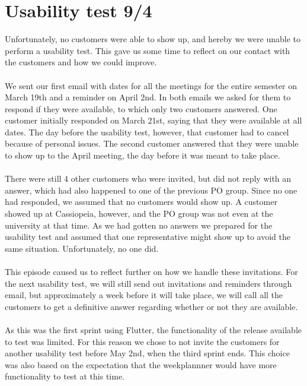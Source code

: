 \section{Usability test 9/4}
Unfortunately, no customers were able to show up, and hereby we were unable to perform a usability test.
This gave us some time to reflect on our contact with the customers and how we could improve.
\\\\
We sent our first email with dates for all the meetings for the entire semester on March 19th and a reminder on April 2nd.
In both emails we asked for them to respond if they were available, to which only two customers answered. 
One customer initially responded on March 21st, saying that they were available at all dates. 
The day before the usability test, however, that customer had to cancel because of personal issues.
The second customer answered that they were unable to show up to the April meeting, the day before it was meant to take place.
\\\\
There were still 4 other customers who were invited, but did not reply with an answer, which had also happened to one of the previous PO group.
Since no one had responded, we assumed that no customers would show up.
A customer showed up at Cassiopeia, however, and the PO group was not even at the university at that time. 
As we had gotten no answers we prepared for the usability test and assumed that one representative might show up to avoid the same situation.
Unfortunately, no one did.
\\\\
This episode caused us to reflect further on how we handle these invitations.
For the next usability test, we will still send out invitations and reminders through email, but approximately a week before it will take place, we will call all the customers to get a definitive answer regarding whether or not they are available. 
\\\\
As this was the first sprint using Flutter, the functionality of the release available to test was limited. 
For this reason we chose to not invite the customers for another usability test before May 2nd, when the third sprint ends.
This choice was also based on the expectation that the weekplannner would have more functionality to test at this time.
